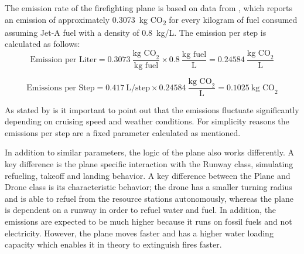 \documentclass[11pt, a4paper]{article}
\begin{document}
The emission rate of the firefighting plane is based on data from \citet*{spicerRapidMeasurementEmissions2009}, which reports an emission of approximately \SI{0.3073}{\kilo\gram} CO\textsubscript{2} for every kilogram of fuel consumed assuming Jet-A fuel with a density of 0.8~kg/L. The emission per step is calculated as follows: 
\[
\text{Emission per Liter}  = 0.3073~\frac{\text{kg CO}_2}{\text{kg fuel}} \times 0.8~\frac{\text{kg fuel}}{\text{L}} = 0.24584~\frac{\text{kg CO}_2}{\text{L}}
\]

\[
\text{Emissions per Step} = 0.417~\text{L/step} \times 0.24584~\frac{\text{kg CO}_2}{\text{L}} = 0.1025~\text{kg CO}_2
\]


As stated by \citet*{spicerRapidMeasurementEmissions2009} is it important to point out that the emissions fluctuate significantly depending on cruising speed and weather conditions. For simplicity reasons the emissions per step are a fixed parameter calculated as mentioned.

In addition to similar parameters, the logic of the plane also works differently. A key difference is the plane specific interaction with the Runway class, simulating refueling, takeoff and landing behavior. A key difference between the Plane and Drone class is its characteristic behavior; the drone has a smaller turning radius and is able to refuel from the resource stations autonomously, whereas the plane is dependent on a runway in order to refuel water and fuel. In addition, the emissions are expected to be much higher because it runs on fossil fuels and not electricity. However, the plane moves faster and has a higher water loading capacity which enables it in theory to extinguish fires faster. 
\end{document}
